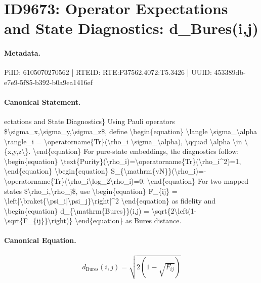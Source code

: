 \section*{ID9673: Operator Expectations and State Diagnostics: d\_Bures(i,j)}
\paragraph{Metadata.}
PiID: 6105070270562 | RTEID: RTE:P37562.4072:T5.3426 | UUID: 453389db-e7e9-5f85-b392-b0a9ea1416ef

\paragraph{Canonical Statement.}
ectations and State Diagnostics\} Using Pauli operators \$\textbackslash{}sigma\_x,\textbackslash{}sigma\_y,\textbackslash{}sigma\_z\$, define \textbackslash{}begin\{equation\} \textbackslash{}langle \textbackslash{}sigma\_\textbackslash{}alpha \textbackslash{}rangle\_i = \textbackslash{}operatorname\{Tr\}(\textbackslash{}rho\_i \textbackslash{}sigma\_\textbackslash{}alpha), \textbackslash{}qquad \textbackslash{}alpha \textbackslash{}in \textbackslash{}\{x,y,z\textbackslash{}\}. \textbackslash{}end\{equation\} For pure-state embeddings, the diagnostics follow: \textbackslash{}begin\{equation\} \textbackslash{}text\{Purity\}(\textbackslash{}rho\_i)=\textbackslash{}operatorname\{Tr\}(\textbackslash{}rho\_i\textasciicircum{}2)=1, \textbackslash{}end\{equation\} \textbackslash{}begin\{equation\} S\_\{\textbackslash{}mathrm\{vN\}\}(\textbackslash{}rho\_i)=-\textbackslash{}operatorname\{Tr\}(\textbackslash{}rho\_i\textbackslash{}log\_2\textbackslash{}rho\_i)=0. \textbackslash{}end\{equation\} For two mapped states \$\textbackslash{}rho\_i,\textbackslash{}rho\_j\$, use \textbackslash{}begin\{equation\} F\_\{ij\} = \textbackslash{}left|\textbackslash{}braket\{\textbackslash{}psi\_i|\textbackslash{}psi\_j\}\textbackslash{}right|\textasciicircum{}2 \textbackslash{}end\{equation\} as fidelity and \textbackslash{}begin\{equation\} d\_\{\textbackslash{}mathrm\{Bures\}\}(i,j) = \textbackslash{}sqrt\{2\textbackslash{}left(1-\textbackslash{}sqrt\{F\_\{ij\}\}\textbackslash{}right)\} \textbackslash{}end\{equation\} as Bures distance.

\paragraph{Canonical Equation.}
\[
d_{\mathrm{Bures}}(i,j) = \sqrt{2\left(1-\sqrt{F_{ij}}\right)}
\]


